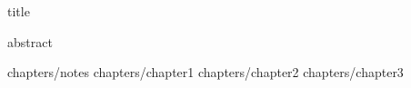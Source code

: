 \documentclass[12pt]{book}
\begin{document}
\frontmatter



{title}

{abstract}
\tableofcontents


\restoregeometry

\mainmatter


\setcounter{chapter}{-1} %
{chapters/notes}
{chapters/chapter1}
{chapters/chapter2}
{chapters/chapter3}

	

\backmatter
\end{document}
